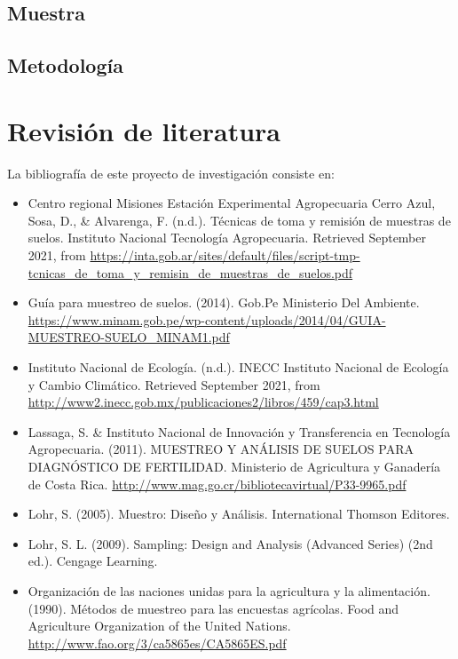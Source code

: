 \documentclass{report}
\begin{document}
\subsection{Muestra}


\subsection{Metodología}


\section{Revisión de literatura}

La bibliografía de este proyecto de investigación consiste en:

\begin{itemize}
    \item Centro regional Misiones Estación Experimental Agropecuaria Cerro Azul, Sosa, D., \& Alvarenga, F. (n.d.). Técnicas de toma y remisión de muestras de suelos. Instituto Nacional Tecnología Agropecuaria. Retrieved September 2021, from \url{https://inta.gob.ar/sites/default/files/script-tmp-tcnicas_de_toma_y_remisin_de_muestras_de_suelos.pdf}
    
    \item Guía para muestreo de suelos. (2014). Gob.Pe Ministerio Del Ambiente. \url{https://www.minam.gob.pe/wp-content/uploads/2014/04/GUIA-MUESTREO-SUELO_MINAM1.pdf}
    
    \item Instituto Nacional de Ecología. (n.d.). INECC Instituto Nacional de Ecología y Cambio Climático. Retrieved September 2021, from \url{http://www2.inecc.gob.mx/publicaciones2/libros/459/cap3.html}
    
    \item Lassaga, S. \& Instituto Nacional de Innovación y Transferencia en Tecnología Agropecuaria. (2011). MUESTREO Y ANÁLISIS DE SUELOS PARA DIAGNÓSTICO DE FERTILIDAD. Ministerio de Agricultura y Ganadería de Costa Rica. \url{http://www.mag.go.cr/bibliotecavirtual/P33-9965.pdf}
    
    \item Lohr, S. (2005). Muestro: Diseño y Análisis. International Thomson Editores.
    
    \item Lohr, S. L. (2009). Sampling: Design and Analysis (Advanced Series) (2nd ed.). Cengage Learning.
    
    \item Organización de las naciones unidas para la agricultura y la alimentación. (1990). Métodos de muestreo para las encuestas agrícolas. Food and Agriculture Organization of the United Nations. \url{http://www.fao.org/3/ca5865es/CA5865ES.pdf}
\end{itemize}
\end{document}
